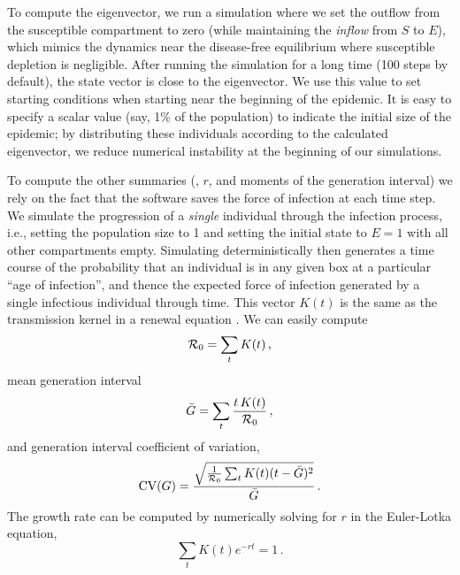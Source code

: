 \documentclass[12pt]{article}\usepackage[]{graphicx}\usepackage[]{color}
\begin{document}
To compute the eigenvector, we run a simulation where we set the outflow from the susceptible compartment to zero (while maintaining the \emph{inflow} from $S$ to $E$), which mimics the dynamics near the disease-free equilibrium where susceptible depletion is negligible. After running the simulation for a long time (100 steps by default), the state vector is close to the eigenvector.  
We use this value to set starting conditions when starting near the beginning of the epidemic. 
It is easy to specify a scalar value (say, 1\% of the population) to indicate the initial size of the epidemic; by distributing these individuals according to the calculated eigenvector, we reduce numerical instability at the beginning of our simulations. 

To compute the other summaries (\Rzero, $r$, and moments of the generation interval) we rely on the fact that the software saves the force of infection at each time step. 
We simulate the progression of a \emph{single} individual through the infection process, i.e., setting the population size to 1 and setting the initial state to $E=1$ with all other compartments empty. 
Simulating deterministically then generates a time course of the probability that an individual is in any given box at a particular “age of infection”, and thence the expected force of infection generated by a single infectious individual through time. 
This vector $K(t)$ is the same as the transmission kernel in a renewal equation \cite{Cham+18}. 
We can easily compute 
\begin{equation}\label{eq:Rzero}
{\mathcal R}_0 = \sum_t K(t) \,, 
\end{equation}
mean generation interval  
\begin{equation}\label{eq:Gbar}
\bar G = \sum_t \frac{t\,K(t)}{{\mathcal R}_0} \,, 
\end{equation}
and generation interval coefficient of variation,
\begin{equation}\label{eq:GCV}
\textrm{CV}(G) = \frac{\sqrt{\frac{1}{{\mathcal R}_0}\sum_t K(t) (t- \bar G)^2}}{\bar G} \,.
\end{equation}
The growth rate can be computed by numerically solving for $r$ in the Euler-Lotka equation,
\begin{equation}\label{eq:Euler-Lotka}
\sum_t  K(t) e^{-r t} = 1 \,.
\end{equation}

\end{document}
